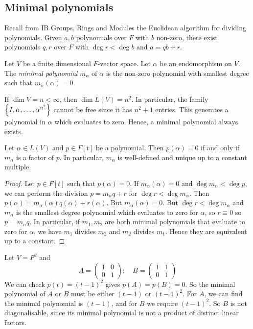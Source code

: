 \subsection{Minimal polynomials}
Recall from IB Groups, Rings and Modules the Euclidean algorithm for dividing polynomials.
Given \( a, b \) polynomials over \( F \) with \( b \) non-zero, there exist polynomials \( q, r \) over \( F \) with \( \deg r < \deg b \) and \( a = qb + r \).
\begin{definition}
	Let \( V \) be a finite dimensional \( F \)-vector space.
	Let \( \alpha \) be an endomorphism on \( V \).
	The \textit{minimal polynomial} \( m_\alpha \) of \( \alpha \) is the non-zero polynomial with smallest degree such that \( m_\alpha(\alpha) = 0 \).
\end{definition}
\begin{remark}
	If \( \dim V = n < \infty \), then \( \dim L(V) = n^2 \).
	In particular, the family \( \qty{I, \alpha, \dots, \alpha^{n^2}} \) cannot be free since it has \( n^2+1 \) entries.
	This generates a polynomial in \( \alpha \) which evaluates to zero.
	Hence, a minimal polynomial always exists.
\end{remark}
\begin{lemma}
	Let \( \alpha \in L(V) \) and \( p \in F[t] \) be a polynomial.
	Then \( p(\alpha) = 0 \) if and only if \( m_\alpha \) is a factor of \( p \).
	In particular, \( m_\alpha \) is well-defined and unique up to a constant multiple.
\end{lemma}
\begin{proof}
	Let \( p \in F[t] \) such that \( p(\alpha) = 0 \).
	If \( m_\alpha(\alpha) = 0 \) and \( \deg m_\alpha < \deg p \), we can perform the division \( p = m_\alpha q + r \) for \( \deg r < \deg m_\alpha \).
	Then \( p(\alpha) = m_\alpha(\alpha) q(\alpha) + r(\alpha) \).
	But \( m_\alpha(\alpha) = 0 \).
	But \( \deg r < \deg m_\alpha \) and \( m_\alpha \) is the smallest degree polynomial which evaluates to zero for \( \alpha \), so \( r \equiv 0 \) so \( p = m_\alpha q \).
	In particular, if \( m_1, m_2 \) are both minimal polynomials that evaluate to zero for \( \alpha \), we have \( m_1 \) divides \( m_2 \) and \( m_2 \) divides \( m_1 \).
	Hence they are equivalent up to a constant.
\end{proof}
\begin{example}
	Let \( V = F^2 \) and
	\[
		A= \begin{pmatrix}
			1 & 0 \\
			0 & 1
		\end{pmatrix};\quad B = \begin{pmatrix}
			1 & 1 \\
			0 & 1
		\end{pmatrix}
	\]
	We can check \( p(t) = (t-1)^2 \) gives \( p(A) = p(B) = 0 \).
	So the minimal polynomial of \( A \) or \( B \) must be either \( (t-1) \) or \( (t-1)^2 \).
	For \( A \), we can find the minimal polynomial is \( (t-1) \), and for \( B \) we require \( (t-1)^2 \).
	So \( B \) is not diagonalisable, since its minimal polynomial is not a product of distinct linear factors.
\end{example}
